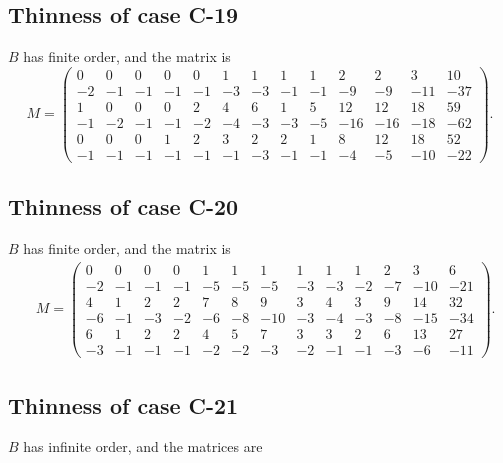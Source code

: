 \documentclass[11pt,a4paper]{amsart}
\theoremstyle{definition}
\theoremstyle{definition}
\numberwithin{equation}{section}
\begin{document}
\subsection{Thinness of case C-19}
$B$ has finite order, and the matrix is
$$ M=\left(\begin{array}{rrrrrrrrrrrrr}
0 & 0 & 0 & 0 & 0 & 1 & 1 & 1 & 1 & 2 & 2 & 3 & 10 \\
-2 & -1 & -1 & -1 & -1 & -3 & -3 & -1 & -1 & -9 & -9 & -11 & -37 \\
1 & 0 & 0 & 0 & 2 & 4 & 6 & 1 & 5 & 12 & 12 & 18 & 59 \\
-1 & -2 & -1 & -1 & -2 & -4 & -3 & -3 & -5 & -16 & -16 & -18 & -62 \\
0 & 0 & 0 & 1 & 2 & 3 & 2 & 2 & 1 & 8 & 12 & 18 & 52 \\
-1 & -1 & -1 & -1 & -1 & -1 & -3 & -1 & -1 & -4 & -5 & -10 & -22
\end{array}\right).$$

\subsection{Thinness of case C-20}
$B$ has finite order, and the matrix is
\begin{align*}
& M=\left(\begin{array}{rrrrrrrrrrrrr}
0 & 0 & 0 & 0 & 1 & 1 & 1 & 1 & 1 & 1 & 2 & 3 & 6 \\
-2 & -1 & -1 & -1 & -5 & -5 & -5 & -3 & -3 & -2 & -7 & -10 & -21 \\
4 & 1 & 2 & 2 & 7 & 8 & 9 & 3 & 4 & 3 & 9 & 14 & 32 \\
-6 & -1 & -3 & -2 & -6 & -8 & -10 & -3 & -4 & -3 & -8 & -15 & -34 \\
6 & 1 & 2 & 2 & 4 & 5 & 7 & 3 & 3 & 2 & 6 & 13 & 27 \\
-3 & -1 & -1 & -1 & -2 & -2 & -3 & -2 & -1 & -1 & -3 & -6 & -11
\end{array}\right).
\end{align*}

\subsection{Thinness of case C-21}
$B$ has infinite order, and the matrices are
\end{document}
